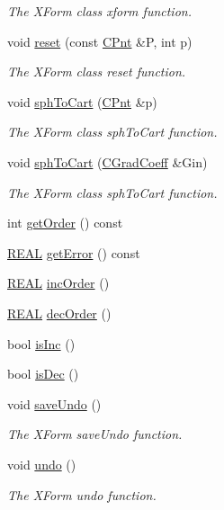 \begin{DoxyCompactItemize}
\begin{DoxyCompactList}\small\item\em The X\-Form class xform function. \end{DoxyCompactList}\item 
void \hyperlink{classCXForm_a4e9f8fd4d9fd24150cd357f724fa10c1}{reset} (const \hyperlink{classCPnt}{C\-Pnt} \&P, int p)
\begin{DoxyCompactList}\small\item\em The X\-Form class reset function. \end{DoxyCompactList}\item 
void \hyperlink{classCXForm_a092244b7fc2a15139d8aefac7600c549}{sph\-To\-Cart} (\hyperlink{classCPnt}{C\-Pnt} \&p)
\begin{DoxyCompactList}\small\item\em The X\-Form class sph\-To\-Cart function. \end{DoxyCompactList}\item 
void \hyperlink{classCXForm_abfae99a00642489f3431c8114112a608}{sph\-To\-Cart} (\hyperlink{classCGradCoeff}{C\-Grad\-Coeff} \&Gin)
\begin{DoxyCompactList}\small\item\em The X\-Form class sph\-To\-Cart function. \end{DoxyCompactList}\item 
int \hyperlink{classCXForm_afb77c0beb4e49769b0eadb717b2d1179}{get\-Order} () const 
\item 
\hyperlink{util_8h_a5821460e95a0800cf9f24c38915cbbde}{R\-E\-A\-L} \hyperlink{classCXForm_aa25c50b2811830ca8e54853a143e5dde}{get\-Error} () const 
\item 
\hyperlink{util_8h_a5821460e95a0800cf9f24c38915cbbde}{R\-E\-A\-L} \hyperlink{classCXForm_a094937703c2d67ef29f5c12fbc65b438}{inc\-Order} ()
\item 
\hyperlink{util_8h_a5821460e95a0800cf9f24c38915cbbde}{R\-E\-A\-L} \hyperlink{classCXForm_a903c633f1ac0756230bcd383e35a1d85}{dec\-Order} ()
\item 
bool \hyperlink{classCXForm_a9b085759beff4d834e56969eb01b7020}{is\-Inc} ()
\item 
bool \hyperlink{classCXForm_a14ededb4bf28f12d9f6525fa5758102d}{is\-Dec} ()
\item 
void \hyperlink{classCXForm_a706bcfdd32f029320524aaa7cbb1427e}{save\-Undo} ()
\begin{DoxyCompactList}\small\item\em The X\-Form save\-Undo function. \end{DoxyCompactList}\item 
void \hyperlink{classCXForm_af7feb93ddf2cd2df187b35b565658d3d}{undo} ()
\begin{DoxyCompactList}\small\item\em The X\-Form undo function. \end{DoxyCompactList}\end{DoxyCompactItemize}
